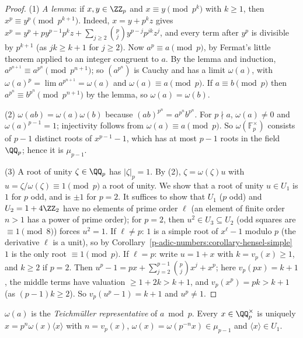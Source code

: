 \begin{proof}
(1) \emph{A lemma}: if $x, y \in \ZZ_p$ and $x \equiv y \pmod{p^k}$ with $k \geq 1$, then $x^p \equiv y^p \pmod{p^{k+1}}$. Indeed, $x = y + p^kz$ gives
$x^p = y^p + py^{p-1}p^kz + \sum_{j \geq 2}\binom pjy^{p-j}p^{jk}z^j$, and every term after $y^p$ is divisible by $p^{k+1}$ (as $jk \geq k + 1$ for $j \geq 2$). Now $a^p \equiv a \pmod p$, by Fermat's little
theorem applied to an integer congruent to $a$. By the lemma and induction, $a^{p^{n+1}} \equiv a^{p^n} \pmod{p^{n+1}}$; so $(a^{p^n})$ is Cauchy and has a limit $\omega(a)$, with
$\omega(a)^p = \lim a^{p^{n+1}} = \omega(a)$ and $\omega(a) \equiv a \pmod p$. If $a \equiv b \pmod p$ then $a^{p^n} \equiv b^{p^n} \pmod{p^{n+1}}$ by the lemma, so $\omega(a) = \omega(b)$.

(2) $\omega(ab) = \omega(a)\omega(b)$ because $(ab)^{p^n} = a^{p^n}b^{p^n}$. For $p \nmid a$, $\omega(a) \neq 0$ and $\omega(a)^{p-1} = 1$; injectivity follows from $\omega(a) \equiv a \pmod p$. So $\omega(\mathbb{F}_p^\times)$
consists of $p - 1$ distinct roots of $x^{p-1} - 1$, which has at most $p - 1$ roots in the field $\QQ_p$; hence it is $\mu_{p-1}$.

(3) A root of unity $\zeta \in \QQ_p$ has $|\zeta|_p = 1$. By (2), $\zeta = \omega(\zeta)u$ with $u = \zeta/\omega(\zeta) \equiv 1 \pmod p$ a root of unity. We show that a root of unity $u \in U_1$ is $1$ for $p$ odd, and is
$\pm1$ for $p = 2$. It suffices to show that $U_1$ ($p$ odd) and $U_2 = 1 + 4\ZZ_2$ have no elements of prime order $\ell$ (an element of finite order $n > 1$ has a power of prime order); for $p = 2$, then $u^2 \in U_3 \subseteq U_2$ (odd squares are $\equiv 1 \pmod 8$)
forces $u^2 = 1$. If $\ell \neq p$: $1$ is a simple root of $x^\ell - 1$ modulo $p$ (the derivative $\ell$ is a unit), so by Corollary~\ref{p-adic-numbers:corollary-hensel-simple} $1$ is the only root
$\equiv 1 \pmod p$. If $\ell = p$: write $u = 1 + x$ with $k = v_p(x) \geq 1$, and $k \geq 2$ if $p = 2$. Then
$u^p - 1 = px + \sum_{j=2}^{p-1}\binom pjx^j + x^p$; here $v_p(px) = k + 1$, the middle terms have valuation $\geq 1 + 2k > k + 1$, and $v_p(x^p) = pk > k + 1$ (as $(p - 1)k \geq 2$). So
$v_p(u^p - 1) = k + 1$ and $u^p \neq 1$.
\end{proof}

\begin{definition}\label{p-adic-numbers:definition-teichmuller}
$\omega(a)$ is the \emph{Teichm\"uller representative} of $a \bmod p$. Every $x \in \QQ_p^\times$ is uniquely $x = p^n\omega(x)\langle x\rangle$ with $n = v_p(x)$, $\omega(x) = \omega(p^{-n}x) \in \mu_{p-1}$ and
$\langle x\rangle \in U_1$.
\end{definition}

